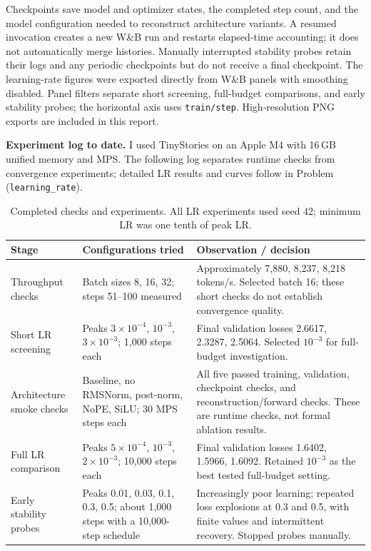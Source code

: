 Checkpoints save model and optimizer states, the completed step count, and the
model configuration needed to reconstruct architecture variants. A resumed
invocation creates a new W\&B run and restarts elapsed-time accounting; it does
not automatically merge histories. Manually interrupted stability probes retain
their logs and any periodic checkpoints but do not receive a final checkpoint.
The learning-rate figures were exported directly from W\&B panels with
smoothing disabled. Panel filters separate short screening, full-budget
comparisons, and early stability probes; the horizontal axis uses
\texttt{train/step}. High-resolution PNG exports are included in this report.

\textbf{Experiment log to date.}
I used TinyStories on an Apple M4 with 16\,GB unified memory and MPS.
The following log separates runtime checks from convergence experiments;
detailed LR results and curves follow in Problem (\texttt{learning\_rate}).

\begin{table}[H]
    \centering
    \small
    \begin{tabular}{@{}>{\raggedright\arraybackslash}p{}
        >{\raggedright\arraybackslash}p{}
        >{\raggedright\arraybackslash}p{}@{}}
        \toprule
        Stage & Configurations tried & Observation / decision \\
        \midrule
        Throughput checks & Batch sizes 8, 16, 32; steps 51--100 measured
        & Approximately 7,880, 8,237, 8,218 tokens/s. Selected batch 16;
          these short checks do not establish convergence quality. \\
        \addlinespace
        Short LR screening & Peaks $3\times10^{-4}$, $10^{-3}$,
          $3\times10^{-3}$; 1,000 steps each
        & Final validation losses 2.6617, 2.3287, 2.5064.
          Selected $10^{-3}$ for full-budget investigation. \\
        \addlinespace
        Architecture smoke checks & Baseline, no RMSNorm, post-norm,
          NoPE, SiLU; 30 MPS steps each
        & All five passed training, validation, checkpoint checks,
          and reconstruction/forward checks. These are runtime checks,
          not formal ablation results. \\
        \addlinespace
        Full LR comparison & Peaks $5\times10^{-4}$, $10^{-3}$,
          $2\times10^{-3}$; 10,000 steps each
        & Final validation losses 1.6402, 1.5966, 1.6092.
          Retained $10^{-3}$ as the best tested full-budget setting. \\
        \addlinespace
        Early stability probes & Peaks 0.01, 0.03, 0.1, 0.3, 0.5;
          about 1,000 steps with a 10,000-step schedule
        & Increasingly poor learning; repeated loss explosions at
          0.3 and 0.5, with finite values and intermittent recovery.
          Stopped probes manually. \\
        \bottomrule
    \end{tabular}
    \caption{Completed checks and experiments. All LR experiments used seed 42;
    minimum LR was one tenth of peak LR.}
    \label{tab:experiment_log}
\end{table}

